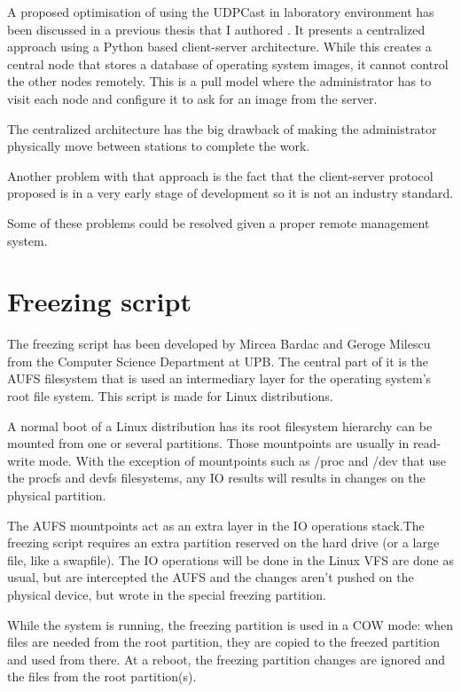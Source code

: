A proposed optimisation of using the UDPCast in laboratory environment
has been discussed in a previous thesis that I authored \cite{paper:me}.
It presents a centralized approach using a Python based client-server
architecture. While this creates a central node that stores a database
of operating system images, it cannot control the other nodes remotely.
This is a pull model where the administrator has to visit each node and
configure it to ask for an image from the server.

The centralized architecture has the big drawback of making the
administrator physically move between stations to complete the work.

Another problem with that approach is the fact that the client-server
protocol proposed is in a very early stage of development so it is not
an industry standard.

Some of these problems could be resolved given a proper remote
management system.

\section{Freezing script}

The freezing script has been developed by Mircea Bardac and Geroge
Milescu from the Computer Science Department at UPB. The central part of
it is the \ac{AUFS} filesystem that is used an intermediary layer for
the operating system's root file system. This script is made for Linux
distributions.

A normal boot of a Linux distribution has its root filesystem hierarchy
can be mounted from one or several partitions. Those mountpoints are
usually in read-write mode. With the exception of mountpoints such as
/proc and /dev that use the procfs and devfs filesystems, any \ac{IO}
results will results in changes on the physical partition.

The \ac{AUFS} mountpoints act as an extra layer in the IO operations
stack.The freezing script requires an extra partition reserved on the
hard drive (or a large file, like a swapfile). The \ac{IO} operations
will be done in the Linux \ac{VFS} are done as usual, but are
intercepted the \ac{AUFS} and the changes aren't pushed on the physical
device, but wrote in the special freezing partition.

While the system is running, the freezing partition is used in a
\ac{COW} mode: when files are needed from the root partition, they are
copied to the freezed partition and used from there. At a reboot, the
freezing partition changes are ignored and the files from the root
partition(s).

